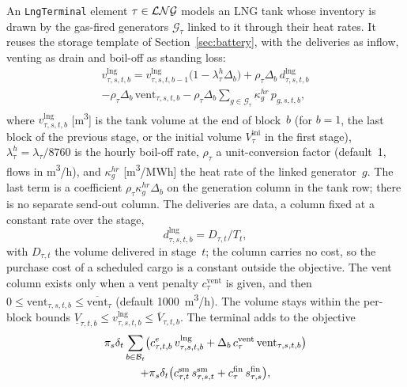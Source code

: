 An \texttt{LngTerminal} element $\tau \in \mathcal{LNG}$ models an LNG tank
whose inventory is drawn by the gas-fired generators
$\mathcal{G}_\tau$ linked to it through their heat rates.  It reuses
the storage template of Section~\ref{sec:battery}, with the deliveries
as inflow, venting as drain and boil-off as standing loss:
\begin{multline}
\label{eq:lng_balance}
v_{\tau,s,t,b}^{\text{lng}}
  = v_{\tau,s,t,b-1}^{\text{lng}} \bigl(1 - \lambda_\tau^h \Delta_b\bigr)
  + \rho_\tau \Delta_b \, d_{\tau,s,t,b}^{\text{lng}} \\
  - \rho_\tau \Delta_b \, \text{vent}_{\tau,s,t,b}
  - \rho_\tau \Delta_b
      \sum_{g \in \mathcal{G}_\tau} \kappa_g^{hr} \, p_{g,s,t,b},
\end{multline}
where $v_{\tau,s,t,b}^{\text{lng}}$ [m\textsuperscript{3}] is the tank
volume at the end of block~$b$ (for $b = 1$, the last block of the
previous stage, or the initial volume $V^{\text{ini}}_\tau$ in the
first stage), $\lambda_\tau^h = \lambda_\tau / 8760$ is the hourly
boil-off rate, $\rho_\tau$ a unit-conversion factor (default~1, flows
in m\textsuperscript{3}/h), and $\kappa_g^{hr}$
[m\textsuperscript{3}/MWh] the heat rate of the linked generator~$g$.
The last term is a coefficient $\rho_\tau \kappa_g^{hr} \Delta_b$ on
the generation column in the tank row; there is no separate send-out
column.  The deliveries are data, a column fixed at a constant rate
over the stage,
\begin{equation}
\label{eq:lng_delivery}
d^{\text{lng}}_{\tau,s,t,b} = D_{\tau,t} / T_t ,
\end{equation}
with $D_{\tau,t}$ the volume delivered in stage~$t$; the column carries
no cost, so the purchase cost of a scheduled cargo is a constant outside
the objective.  The vent column exists only when a vent penalty
$c^{\text{vent}}_\tau$ is given, and then
$0 \leq \text{vent}_{\tau,s,t,b} \leq \overline{\text{vent}}_\tau$
(default 1000~m\textsuperscript{3}/h).  The volume stays within the
per-block bounds
$\underline{V}_{\tau,t,b} \leq v^{\text{lng}}_{\tau,s,t,b} \leq
\overline{V}_{\tau,t,b}$.  The terminal adds to the objective
\begin{multline}
\label{eq:lng_cost}
\pi_s \delta_t \sum_{b \in \mathcal{B}_t} \bigl(
  c^{e}_{\tau,t,b}\, v^{\text{lng}}_{\tau,s,t,b}
  + \Delta_b\, c^{\text{vent}}_\tau\, \text{vent}_{\tau,s,t,b} \bigr) \\
+ \pi_s \delta_t \bigl( c^{\text{sm}}_{\tau,t}\, s^{\text{sm}}_{\tau,s,t}
  + c^{\text{fin}}_\tau\, s^{\text{fin}}_{\tau,s} \bigr),
\end{multline}
